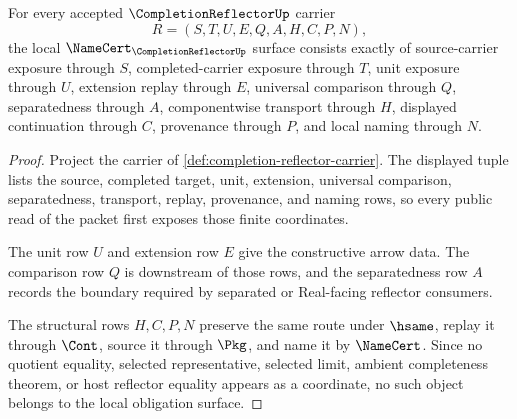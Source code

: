 \begin{theorem}
\label{thm:completion-reflector-namecert-obligations}
For every accepted $\CompletionReflectorUp$ carrier
$$
R=(S,T,U,E,Q,A,H,C,P,N),
$$
the local $\NameCert_{\CompletionReflectorUp}$ surface consists exactly of source-carrier exposure through $S$, completed-carrier exposure through $T$, unit exposure through $U$, extension replay through $E$, universal comparison through $Q$, separatedness through $A$, componentwise transport through $H$, displayed continuation through $C$, provenance through $P$, and local naming through $N$.
\end{theorem}
\begin{proof}
Project the carrier of \autoref{def:completion-reflector-carrier}. The displayed tuple lists the source, completed target, unit, extension, universal comparison, separatedness, transport, replay, provenance, and naming rows, so every public read of the packet first exposes those finite coordinates.

The unit row $U$ and extension row $E$ give the constructive arrow data. The comparison row $Q$ is downstream of those rows, and the separatedness row $A$ records the boundary required by separated or Real-facing reflector consumers.

The structural rows $H,C,P,N$ preserve the same route under $\hsame$, replay it through $\Cont$, source it through $\Pkg$, and name it by $\NameCert$. Since no quotient equality, selected representative, selected limit, ambient completeness theorem, or host reflector equality appears as a coordinate, no such object belongs to the local obligation surface.
\end{proof}

